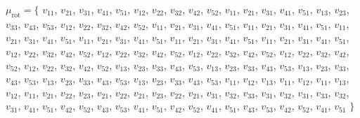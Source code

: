 \documentclass{amsart}
\theoremstyle{plain}
\theoremstyle{definition}
\theoremstyle{remark}
\newcommand{\murot}{{\mu_{\text{rot}}}}
\newlength\inlmutseqhang
\newcommand{\inlmutseq}[2]{%
  {\small%
    \settowidth\inlmutseqhang{$#1 = \big\{~$~}%
    \hangindent\inlmutseqhang%
    \noindent $#1 = \big\{$ #2 $\big\}$\par}%
}
\begin{document}
  \inlmutseq{\murot}{ $v_{1 1}$, $v_{2 1}$, $v_{3 1}$, $v_{4 1}$, $v_{5
      1}$, $v_{1 2}$, $v_{2 2}$, $v_{3 2}$, $v_{4 2}$, $v_{5 2}$, $v_{1
      1}$, $v_{2 1}$, $v_{3 1}$, $v_{4 1}$, $v_{5 1}$, $v_{1 3}$, $v_{2
      3}$, $v_{3 3}$, $v_{4 3}$, $v_{5 3}$, $v_{1 2}$, $v_{2 2}$, $v_{3
      2}$, $v_{4 2}$, $v_{5 2}$, $v_{1 1}$, $v_{2 1}$, $v_{3 1}$, $v_{4
      1}$, $v_{5 1}$, $v_{1 1}$, $v_{2 1}$, $v_{3 1}$, $v_{4 1}$, $v_{5
      1}$, $v_{1 1}$, $v_{2 1}$, $v_{3 1}$, $v_{4 1}$, $v_{5 1}$, $v_{1
      1}$, $v_{2 1}$, $v_{3 1}$, $v_{4 1}$, $v_{5 1}$, $v_{1 1}$, $v_{2
      1}$, $v_{3 1}$, $v_{4 1}$, $v_{5 1}$, $v_{1 1}$, $v_{2 1}$, $v_{3
      1}$, $v_{4 1}$, $v_{5 1}$, $v_{1 2}$, $v_{2 2}$, $v_{3 2}$, $v_{4
      2}$, $v_{5 2}$, $v_{1 2}$, $v_{2 2}$, $v_{3 2}$, $v_{4 2}$, $v_{5
      2}$, $v_{1 2}$, $v_{2 2}$, $v_{3 2}$, $v_{4 2}$, $v_{5 2}$, $v_{1
      2}$, $v_{2 2}$, $v_{3 2}$, $v_{4 2}$, $v_{5 2}$, $v_{1 2}$, $v_{2
      2}$, $v_{3 2}$, $v_{4 2}$, $v_{5 2}$, $v_{1 3}$, $v_{2 3}$, $v_{3
      3}$, $v_{4 3}$, $v_{5 3}$, $v_{1 3}$, $v_{2 3}$, $v_{3 3}$, $v_{4
      3}$, $v_{5 3}$, $v_{1 3}$, $v_{2 3}$, $v_{3 3}$, $v_{4 3}$, $v_{5
      3}$, $v_{1 3}$, $v_{2 3}$, $v_{3 3}$, $v_{4 3}$, $v_{5 3}$, $v_{1
      3}$, $v_{2 3}$, $v_{3 3}$, $v_{4 3}$, $v_{5 3}$, $v_{1 1}$, $v_{1
      2}$, $v_{1 3}$, $v_{1 1}$, $v_{1 2}$, $v_{1 1}$, $v_{1 3}$, $v_{1
      2}$, $v_{1 1}$, $v_{2 1}$, $v_{2 2}$, $v_{2 3}$, $v_{2 1}$, $v_{2
      2}$, $v_{2 1}$, $v_{2 3}$, $v_{2 2}$, $v_{2 1}$, $v_{3 1}$, $v_{3
      2}$, $v_{3 3}$, $v_{3 1}$, $v_{3 2}$, $v_{3 1}$, $v_{3 3}$, $v_{3
      2}$, $v_{3 1}$, $v_{4 1}$, $v_{5 1}$, $v_{4 2}$, $v_{5 2}$, $v_{4
      3}$, $v_{5 3}$, $v_{4 1}$, $v_{5 1}$, $v_{4 2}$, $v_{5 2}$, $v_{4
      1}$, $v_{5 1}$, $v_{4 3}$, $v_{5 3}$, $v_{4 2}$, $v_{5 2}$, $v_{4
      1}$, $v_{5 1}$ }
\end{document}
